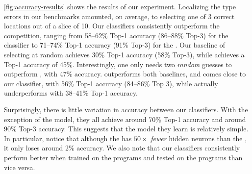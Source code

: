 \autoref{fig:accuracy-results} shows the results of our experiment.
%
Localizing the type errors in our benchmarks amounted, on average, to
selecting one of 3 correct locations out of a slice of 10.
%
Our classifiers consistently outperform the competition, ranging from
58--62\% Top-1 accuracy (86--88\% Top-3) for the \linear classifier to
71--74\% Top-1 accuracy (91\% Top-3) for the \hiddenFH.
%
Our baseline of selecting at random achieves 30\% Top-1
accuracy (58\% Top-3), while \ocaml achieves a Top-1 accuracy of 45\%.
%
Interestingly, one only needs two \emph{random} guesses to outperform
\ocaml, with 47\% accuracy.
%
\sherrloc outperforms both baselines, and comes close to our \linear
classifier, with 56\% Top-1 accuracy (84--86\% Top 3), while \mycroft
actually underperforms \ocaml with 38--41\% Top-1 accuracy.
%

Surprisingly, there is little variation in accuracy between our
classifiers.
%
With the exception of the \linear model, they all achieve around 70\%
Top-1 accuracy and around 90\% Top-3 accuracy.
%
This suggests that the model they learn is relatively simple.
%
In particular, notice that although the \hiddenT has $50\times$ \emph{fewer}
hidden neurons than the \hiddenFH, it only loses around 2\% accuracy.
%
We also note that our classifiers consistently perform better when
trained on the \FALL programs and tested on the \SPRING programs than
vice versa.
